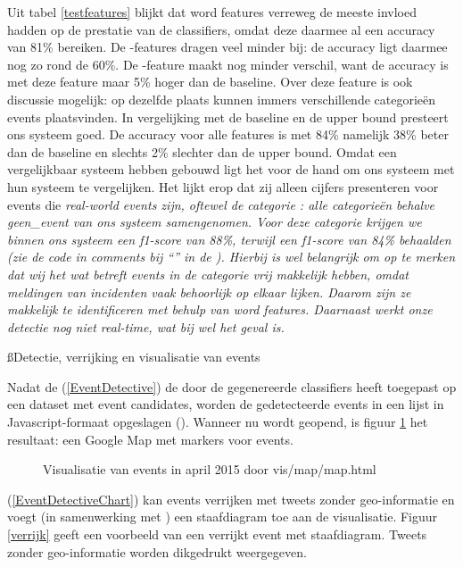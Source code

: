 {{Uit tabel \ref{testfeatures} blijkt dat word features verreweg de meeste invloed hadden op de prestatie van de classifiers, omdat deze daarmee al een accuracy
van 81\% bereiken. De -features dragen veel minder bij: de accuracy ligt daarmee nog zo rond de 60\%. De -feature maakt
nog minder verschil, want de accuracy is met deze feature maar 5\% hoger dan de baseline. Over deze feature is ook discussie
mogelijk: op dezelfde plaats kunnen immers verschillende categorie\"en events plaatsvinden.
\vl
In vergelijking met de baseline en de upper bound presteert ons systeem goed. De accuracy voor alle features is met 84\% namelijk 38\% beter dan de baseline
en slechts 2\% slechter dan de upper bound. Omdat \citet{walther2013geo} een vergelijkbaar systeem hebben gebouwd ligt het voor
de hand om ons systeem met hun systeem te vergelijken. Het lijkt erop dat zij alleen cijfers presenteren voor events die \it{real-world
events} zijn, oftewel de categorie : alle categorie\"en behalve \it{geen\_event} van ons systeem samengenomen. Voor deze categorie
krijgen we binnen ons systeem een f1-score van 88\%, terwijl \citet{walther2013geo} een f1-score van 84\% behaalden (zie de code
in comments bij ``'' in de ). Hierbij is wel belangrijk om op te merken dat wij
het wat betreft events in de categorie  vrij makkelijk hebben, omdat meldingen van incidenten vaak behoorlijk op elkaar lijken. Daarom 
zijn ze makkelijk te identificeren met behulp van word features. Daarnaast werkt onze detectie nog niet real-time, wat bij \citet{walther2013geo}
wel het geval is.

\ss{Detectie, verrijking en visualisatie van events}\label{detvervis}

Nadat de  (\ref{EventDetective}) de door de  gegenereerde classifiers heeft 
toegepast op een dataset met event candidates, worden de gedetecteerde events in een lijst in Javascript-formaat 
opgeslagen (). Wanneer nu  wordt geopend, is figuur \ref{standaardvis} het resultaat: een Google Map met
markers voor events.

\begin{figure}[H]
  \centering
    \caption{Visualisatie van events in april 2015 door vis/map/map.html}
  \label{standaardvis}
\end{figure}

 (\ref{EventDetectiveChart}) kan events verrijken met tweets zonder geo-informatie en voegt (in samenwerking
met ) een staafdiagram toe aan de visualisatie. Figuur \ref{verrijk} geeft een voorbeeld van een verrijkt event met staafdiagram.
Tweets zonder geo-informatie worden dikgedrukt weergegeven.

}}
